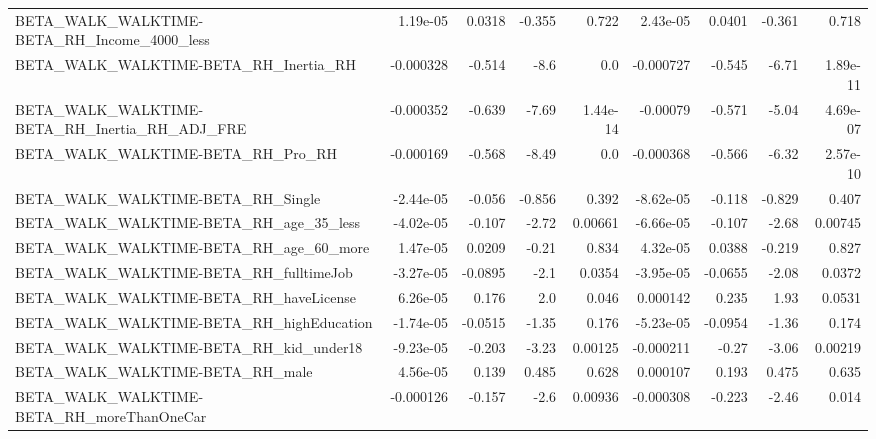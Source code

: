 \begin{tabular}{lrrrrrrrr}
BETA\_WALK\_WALKTIME-BETA\_RH\_Income\_4000\_less        &    1.19e-05 &       0.0318 &   -0.355 &    0.722 &   2.43e-05 &      0.0401 &       -0.361 &         0.718 \\
BETA\_WALK\_WALKTIME-BETA\_RH\_Inertia\_RH              &   -0.000328 &       -0.514 &     -8.6 &      0.0 &  -0.000727 &      -0.545 &        -6.71 &      1.89e-11 \\
BETA\_WALK\_WALKTIME-BETA\_RH\_Inertia\_RH\_ADJ\_FRE      &   -0.000352 &       -0.639 &    -7.69 & 1.44e-14 &   -0.00079 &      -0.571 &        -5.04 &      4.69e-07 \\
BETA\_WALK\_WALKTIME-BETA\_RH\_Pro\_RH                  &   -0.000169 &       -0.568 &    -8.49 &      0.0 &  -0.000368 &      -0.566 &        -6.32 &      2.57e-10 \\
BETA\_WALK\_WALKTIME-BETA\_RH\_Single                  &   -2.44e-05 &       -0.056 &   -0.856 &    0.392 &  -8.62e-05 &      -0.118 &       -0.829 &         0.407 \\
BETA\_WALK\_WALKTIME-BETA\_RH\_age\_35\_less             &   -4.02e-05 &       -0.107 &    -2.72 &  0.00661 &  -6.66e-05 &      -0.107 &        -2.68 &       0.00745 \\
BETA\_WALK\_WALKTIME-BETA\_RH\_age\_60\_more             &    1.47e-05 &       0.0209 &    -0.21 &    0.834 &   4.32e-05 &      0.0388 &       -0.219 &         0.827 \\
BETA\_WALK\_WALKTIME-BETA\_RH\_fulltimeJob             &   -3.27e-05 &      -0.0895 &     -2.1 &   0.0354 &  -3.95e-05 &     -0.0655 &        -2.08 &        0.0372 \\
BETA\_WALK\_WALKTIME-BETA\_RH\_haveLicense             &    6.26e-05 &        0.176 &      2.0 &    0.046 &   0.000142 &       0.235 &         1.93 &        0.0531 \\
BETA\_WALK\_WALKTIME-BETA\_RH\_highEducation           &   -1.74e-05 &      -0.0515 &    -1.35 &    0.176 &  -5.23e-05 &     -0.0954 &        -1.36 &         0.174 \\
BETA\_WALK\_WALKTIME-BETA\_RH\_kid\_under18             &   -9.23e-05 &       -0.203 &    -3.23 &  0.00125 &  -0.000211 &       -0.27 &        -3.06 &       0.00219 \\
BETA\_WALK\_WALKTIME-BETA\_RH\_male                    &    4.56e-05 &        0.139 &    0.485 &    0.628 &   0.000107 &       0.193 &        0.475 &         0.635 \\
BETA\_WALK\_WALKTIME-BETA\_RH\_moreThanOneCar          &   -0.000126 &       -0.157 &     -2.6 &  0.00936 &  -0.000308 &      -0.223 &        -2.46 &         0.014 \\

\end{tabular}
